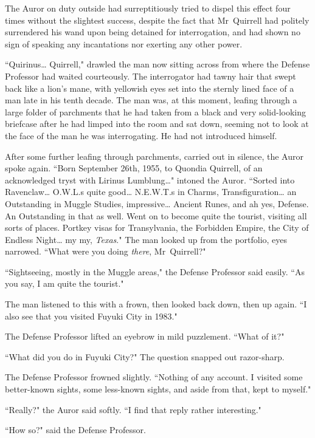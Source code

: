 The Auror on duty outside had surreptitiously tried to dispel this effect four times without the slightest success, despite the fact that Mr~Quirrell had politely surrendered his wand upon being detained for interrogation, and had shown no sign of speaking any incantations nor exerting any other power.

``Quirinus{\ldots} Quirrell," drawled the man now sitting across from where the Defense Professor had waited courteously. The interrogator had tawny hair that swept back like a lion's mane, with yellowish eyes set into the sternly lined face of a man late in his tenth decade. The man was, at this moment, leafing through a large folder of parchments that he had taken from a black and very solid-looking briefcase after he had limped into the room and sat down, seeming not to look at the face of the man he was interrogating. He had not introduced himself.

After some further leafing through parchments, carried out in silence, the Auror spoke again. ``Born September 26th, 1955, to Quondia Quirrell, of an acknowledged tryst with Lirinus Lumblung{\ldots}" intoned the Auror. ``Sorted into Ravenclaw{\ldots} O.W.L.s quite good{\ldots} N.E.W.T.s in Charms, Transfiguration{\ldots} an Outstanding in Muggle Studies, impressive{\ldots} Ancient Runes, and ah yes, Defense. An Outstanding in that as well. Went on to become quite the tourist, visiting all sorts of places. Portkey visas for Transylvania, the Forbidden Empire, the City of Endless Night{\ldots} my my, \emph{Texas}." The man looked up from the portfolio, eyes narrowed. ``What were you doing \emph{there}, Mr~Quirrell?"

``Sightseeing, mostly in the Muggle areas," the Defense Professor said easily. ``As you say, I am quite the tourist."

The man listened to this with a frown, then looked back down, then up again. ``I also see that you visited Fuyuki City in 1983."

The Defense Professor lifted an eyebrow in mild puzzlement. ``What of it?"

``What did you do in Fuyuki City?" The question snapped out razor-sharp.

The Defense Professor frowned slightly. ``Nothing of any account. I visited some better-known sights, some less-known sights, and aside from that, kept to myself."

``Really?" the Auror said softly. ``I find that reply rather interesting."

``How so?" said the Defense Professor.

